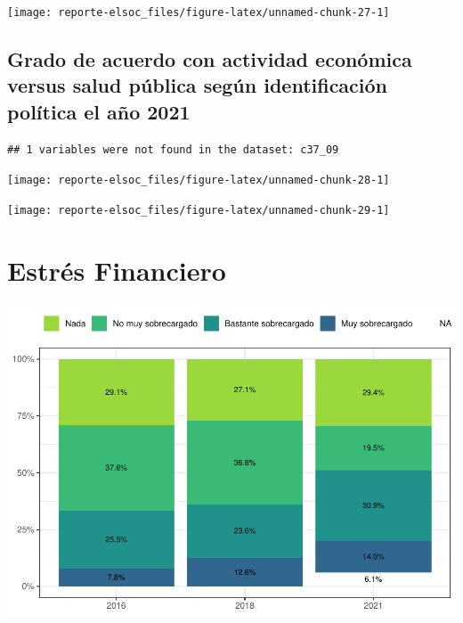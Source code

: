 \documentclass[
  12pt,
]{book}
\begin{document}
\begin{center}\texttt{[image: reporte-elsoc\_files/figure-latex/unnamed-chunk-27-1]} \end{center}

\hypertarget{grado-de-acuerdo-con-actividad-econuxf3mica-versus-salud-puxfablica-seguxfan-identificaciuxf3n-poluxedtica-el-auxf1o-2021}{%
\subsection{Grado de acuerdo con actividad económica versus salud pública según identificación política el año 2021}\label{grado-de-acuerdo-con-actividad-econuxf3mica-versus-salud-puxfablica-seguxfan-identificaciuxf3n-poluxedtica-el-auxf1o-2021}}

\begin{verbatim}
## 1 variables were not found in the dataset: c37_09
\end{verbatim}

\begin{center}\texttt{[image: reporte-elsoc\_files/figure-latex/unnamed-chunk-28-1]} \end{center}

\begin{center}\texttt{[image: reporte-elsoc\_files/figure-latex/unnamed-chunk-29-1]} \end{center}

\hypertarget{estruxe9s-financiero}{%
\section{Estrés Financiero}\label{estruxe9s-financiero}}

\begin{center}\includegraphics{reporte-elsoc_files/figure-latex/satisfaccion-wave-1} \end{center}
\end{document}
